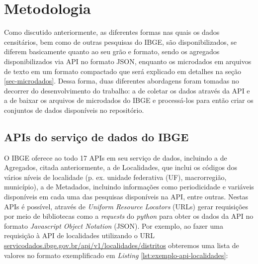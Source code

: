 \chapter{Metodologia}

    

    Como discutido anteriormente, as diferentes formas nas quais os dados censitários, bem como de outras pesquisas do IBGE, são disponibilizados, se diferem basicamente quanto ao seu grão e formato, sendo os agregados disponibilizados via API no formato JSON, enquanto os microdados em arquivos de texto em um formato compactado que será explicado em detalhes na seção \ref{sec-microdados}. Dessa forma, duas diferentes abordagens foram tomadas no decorrer do desenvolvimento do trabalho: a de coletar os dados através da API e a de baixar os arquivos de microdados do IBGE e processá-los para então criar os conjuntos de dados disponíveis no repositório.
    

\section{APIs do serviço de dados do IBGE}
\label{metodoslogia-API}

    O IBGE oferece ao todo 17 APIs em seu serviço de dados, incluindo a de Agregados, citada anteriormente, a de Localidades, que inclui os códigos dos vários níveis de localidade (p. ex. unidade federativa (UF), macrorregião, município), a de Metadados, incluindo informações como periodicidade e variáveis disponíveis em cada uma das pesquisas disponíveis na API, entre outras. Nestas APIs é possível, através de \textit{Uniform Resource Locators} (URLs) gerar requisições por meio de bibliotecas como a \textit{requests} do \textit{python} para obter os dados da API no formato \textit{Javascript Object Notation} (JSON). Por exemplo, ao fazer uma requisição à API de localidades utilizando o URL \url{servicodados.ibge.gov.br/api/v1/localidades/distritos} obteremos uma lista de valores no formato exemplificado em \textit{Listing} \ref{lst:exemplo-api-localidades}:

